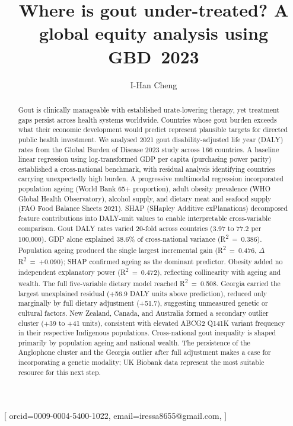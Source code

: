 \documentclass[]{ceurart}
\begin{document}


\title{Where is gout under-treated?
  A global equity analysis using GBD~2023}

\author[1]{I-Han Cheng}[%
  orcid=0009-0004-5400-1022,
  email=iressa8655@gmail.com,
]
\cormark[1]

\address[1]{Nuffield Department of Orthopaedics, Rheumatology and
  Musculoskeletal Sciences (NDORMS), Botnar Institute for Musculoskeletal
  Sciences, University of Oxford, Oxford, United Kingdom}


\begin{abstract}
Gout is clinically manageable with established urate-lowering therapy, yet
treatment gaps persist across health systems worldwide. Countries whose gout burden exceeds what their economic development
would predict represent plausible targets for directed public health
investment. We analysed 2021 gout disability-adjusted life year (DALY) rates
from the Global Burden of Disease 2023 study across 166 countries. A baseline
linear regression using log-transformed GDP per capita (purchasing power
parity) established a cross-national benchmark, with residual analysis
identifying countries carrying unexpectedly high burden. A progressive
multimodal regression incorporated population ageing (World Bank 65+
proportion), adult obesity prevalence (WHO Global Health Observatory), alcohol
supply, and dietary meat and seafood supply (FAO Food Balance Sheets 2021).
SHAP (SHapley Additive exPlanations) decomposed feature contributions into
DALY-unit values to enable interpretable cross-variable comparison. Gout DALY
rates varied 20-fold across countries (3.97 to 77.2 per 100,000). GDP alone
explained 38.6\% of cross-national variance (R\textsuperscript{2}~=~0.386).
Population ageing produced the single largest incremental gain
(R\textsuperscript{2}~=~0.476, $\Delta$R\textsuperscript{2}~=~+0.090); SHAP
confirmed ageing as the dominant predictor. Obesity added no independent
explanatory power (R\textsuperscript{2}~=~0.472), reflecting collinearity
with ageing and wealth. The full five-variable dietary model reached
R\textsuperscript{2}~=~0.508. Georgia carried the largest unexplained residual
(+56.9 DALY units above prediction), reduced only marginally by full dietary
adjustment (+51.7), suggesting unmeasured genetic or cultural factors. New
Zealand, Canada, and Australia formed a secondary outlier cluster (+39 to +41
units), consistent with elevated ABCG2 Q141K variant frequency in their
respective Indigenous populations. Cross-national gout inequality is shaped
primarily by population ageing and national wealth. The persistence of the
Anglophone cluster and the Georgia outlier after full adjustment makes a case
for incorporating a genetic modality; UK Biobank data represent the most
suitable resource for this next step.
\end{abstract}
\end{document}
